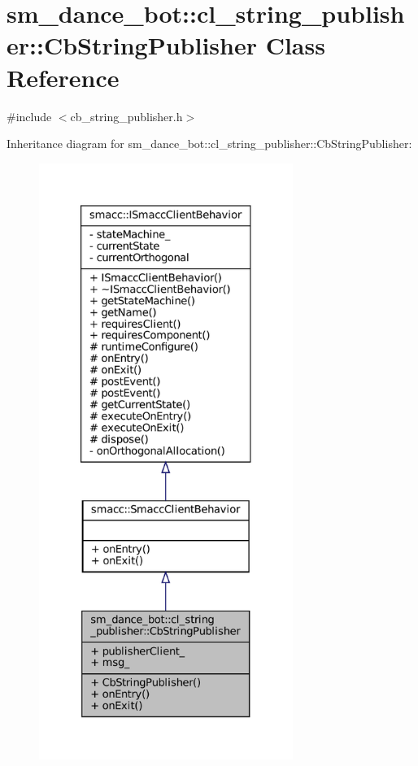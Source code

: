 \hypertarget{classsm__dance__bot_1_1cl__string__publisher_1_1CbStringPublisher}{}\section{sm\+\_\+dance\+\_\+bot\+:\+:cl\+\_\+string\+\_\+publisher\+:\+:Cb\+String\+Publisher Class Reference}
\label{classsm__dance__bot_1_1cl__string__publisher_1_1CbStringPublisher}


{\ttfamily \#include $<$cb\+\_\+string\+\_\+publisher.\+h$>$}



Inheritance diagram for sm\+\_\+dance\+\_\+bot\+:\+:cl\+\_\+string\+\_\+publisher\+:\+:Cb\+String\+Publisher\+:
\nopagebreak
\begin{figure}[H]
\begin{center}
\leavevmode
\includegraphics[height=550pt]{classsm__dance__bot_1_1cl__string__publisher_1_1CbStringPublisher__inherit__graph}
\end{center}
\end{figure}



